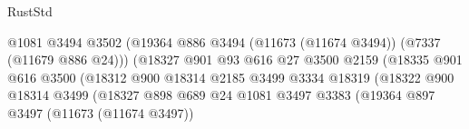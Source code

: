 \begin{lexlean}{RustStd}
\begin{coremodule}
                                                    @1081
                                                    @3494
                                                    @3502
                                                    (@19364
                                                      @886
                                                      @3494
                                                      (@11673 (@11674 @3494))
                                                      (@7337 (@11679 @886 @24)))
                                                    (@18327
                                                      @901
                                                      @93
                                                      @616
                                                      @27
                                                      @3500
                                                      @2159
                                                      (@18335
                                                        @901
                                                        @616
                                                        @3500
                                                        (@18312
                                                          @900
                                                          @18314
                                                          @2185
                                                          @3499
                                                          @3334
                                                          @18319
                                                          (@18322
                                                            @900
                                                            @18314
                                                            @3499
                                                            (@18327
                                                              @898
                                                              @689
                                                              @24
                                                              @1081
                                                              @3497
                                                              @3383
                                                              (@19364
                                                                @897
                                                                @3497
                                                                (@11673 (@11674 @3497))

\end{coremodule}
\end{lexlean}
